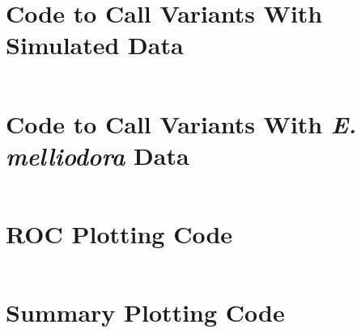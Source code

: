\section{Code to Call Variants With Simulated Data}
\inputminted[breaklines, breakanywhere, tabsize=2]{Makefile}{ch5/scripts/sim_variants_makefiles.txt}
\section{Code to Call Variants With \textit{E. melliodora} Data}
\inputminted[breaklines, breakanywhere, tabsize=2]{Makefile}{ch5/scripts/euc_variants_makefiles.txt}
\section{ROC Plotting Code}
\inputminted[breaklines, breakanywhere, tabsize=2]{r}{ch5/scripts/roc_plots.R}
\section{Summary Plotting Code}
\inputminted[breaklines, breakanywhere, tabsize=2]{r}{ch5/scripts/hapdip_summary_plots.R}

